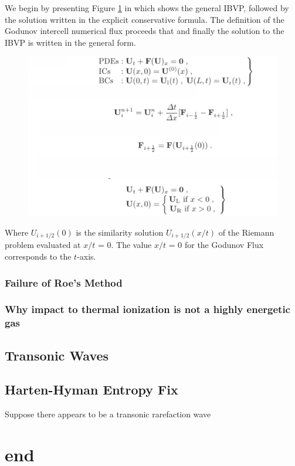 \documentclass[]{article}
\begin{document}
		We begin by presenting Figure \ref{ARP IBVP} in which shows the general IBVP, followed by the solution written in the explicit conservative formula. The definition of the Godunov intercell numerical flux proceeds that and finally the solution to the IBVP is written in the general form.
		\begin{figure}[h] 	
			\centering
			\includegraphics[scale=.50]{Approx_RP_GodFlux_IBVP}
			\caption{}
			\label{ARP IBVP}
		\end{figure}
		Where $ U_{i+1/2}(0) $ is the similarity solution $ U_{i+1/2}(x/t) $ of the Riemann problem evaluated at $ x/t $ = 0. The value $ x/t $ = 0 for the Godunov Flux corresponds to the $ t $-axis.
			
		\subsubsection{Failure of Roe's Method}		
		\subsubsection{Why impact to thermal ionization is not a highly energetic gas}
	\subsection{Transonic Waves}
	\subsection{Harten-Hyman Entropy Fix}
		Suppose there appears to be a transonic rarefaction wave
		
\section{end}


\end{document}
